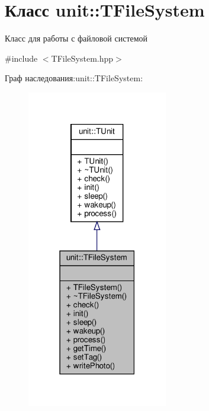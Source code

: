 \hypertarget{classunit_1_1_t_file_system}{}\section{Класс unit\+:\+:T\+File\+System}
\label{classunit_1_1_t_file_system}


Класс для работы с файловой системой  




{\ttfamily \#include $<$T\+File\+System.\+hpp$>$}



Граф наследования\+:unit\+:\+:T\+File\+System\+:\nopagebreak
\begin{figure}[H]
\begin{center}
\leavevmode
\includegraphics[width=174pt]{classunit_1_1_t_file_system__inherit__graph}
\end{center}
\end{figure}


